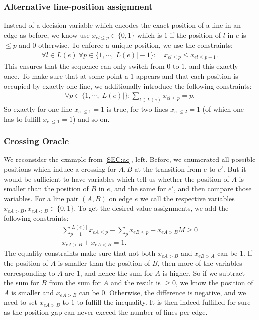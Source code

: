 \documentclass{llncs}
\begin{document}
\subsubsection{Alternative line-position assignment}
Instead of a decision variable which encodes the exact position of a line in an edge as before, we know use $x_{el\leq p} \in \{0,1\}$ which is $1$ if the position of $l$ in $e$ is $\leq p$ and $0$ otherwise. To enforce a unique position, we use the constraints:
\begin{align}
	\forall l \in L(e)~ \forall p \in \{1, \cdots, |L(e)|-1\}: \quad x_{el\leq p} \leq x_{el\leq p+1}. \label{EQ:up_constr}
\end{align}
This ensures that the sequence can only switch from $0$ to $1$, and this exactly once. To make sure that at some point a $1$ appears and that each position is occupied by exactly one line, we additionally introduce the following constraints:
\begin{align}
	\forall p \in \{1, \cdots, |L(e)|\}: \sum_{l \in L(e)} x_{el\leq p} = p. \label{EQ:01_constr}
\end{align}
So exactly for  one line $x_{e.\leq 1} =1$ is true, for two lines $x_{e.\leq 2} = 1$ (of which one has to fulfill $x_{e.\leq 1} =1$) and so on.

\subsubsection{Crossing Oracle}
We reconsider the example from \ref{SEC:ac}, left. Before, we enumerated all possible positions which induce a crossing for $A, B$ at the transition from $e$ to $e'$. But it would be sufficient to have variables which tell us whether the position of $A$ is smaller than the position of $B$ in $e$, and the same for $e'$, and then compare those variables. For a line pair $(A,B)$ on edge $e$ we call the respective variables $x_{eA>B}, x_{eA<B} \in \{0, 1\}$. %
To get the desired value assignments, we add the following constraints:
\begin{gather}
	\sum_{p=1}^{|L(e)|} x_{eA\leq p} - \sum_{p} x_{eB\leq p} + x_{eA>B} M \geq 0 \\
	x_{eA>B} + x_{eA<B}=1.
\end{gather}
The equality constraints make sure that not both $x_{eA>B}$ and $x_{eB>A}$ can be $1$. If the position of $A$ is smaller than the position of $B$, then more of the variables corresponding to $A$ are $1$, and hence the sum for $A$ is higher. So if we subtract the sum for $B$ from the sum for $A$ and the result is $\geq 0$, we know the position of $A$ is  smaller and $x_{eA>B}$ can be $0$. Otherwise, the difference is negative, and we need to set $x_{eA>B}$ to $1$ to fulfill the inequality. It is then indeed fulfilled for sure as the position gap can never exceed the number of lines per edge.
\end{document}
